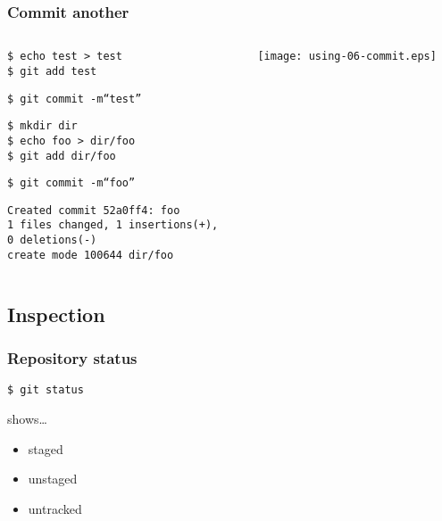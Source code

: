 \documentclass[english]{beamer}
\newcommand{\mysubsection}[2]{%
  \hypertarget{#2}{}%
  \subsection{#1}%
  \label{#2}%
}
\newcommand{\CMD}[1]{%
\texttt{\textcolor{code-green}{#1}}%
}
\newcommand{\cmd}[1]{%
\texttt{\textcolor{code-orange}{#1}}%
}
\newcommand{\fnt}[1]{%
\texttt{\textcolor{code-gray}{#1}}%
}
\begin{document}
\begin{frame}
\frametitle{Commit another}
\begin{columns}[t]
        \begin{column}[T]{.5\textwidth}
                \cmd{\$ echo test > test} \\
                \CMD{\$ git add test}

                \vspace{.1\textheight}

                \CMD{\$ git commit -m``test''} \\

                \vspace{.1\textheight}

                \cmd{\$ mkdir dir} \\
                \cmd{\$ echo foo > dir/foo} \\
                \CMD{\$ git add dir/foo}

                \vspace{.1\textheight}

                \CMD{\$ git commit -m``foo''} \\
                {\tiny
                \fnt{Created commit 52a0ff4: foo \\
                       1 files changed, 1 insertions(+), \\ 0 deletions(-) \\
                       create mode 100644 dir/foo}
                }
        \end{column}
        \begin{column}[T]{.5\textwidth}

                \texttt{[image: using-06-commit.eps]}

        \end{column}
\end{columns}
\end{frame}

\mysubsection{Inspection}{using:inspection}
\begin{frame}
\frametitle{Repository status}

\CMD{\$ git status}

\vspace{.1\textheight}
shows\ldots
\begin{itemize}
        \item staged
        \item unstaged
        \item untracked
\end{itemize}
\end{frame}
\end{document}
